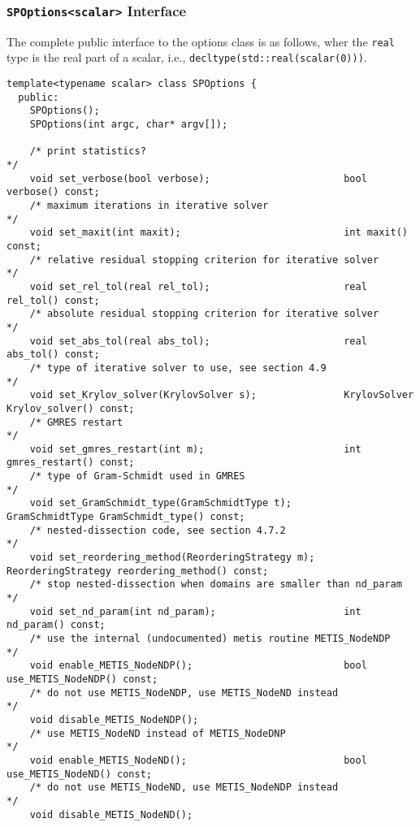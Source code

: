 \documentclass{article}
\begin{document}
\subsubsection{\lstinline[style=C]!SPOptions<scalar>! Interface}
\label{sec:SPOptions}
The complete public interface to the options class is as follows, wher
the \lstinline[style=C]!real! type is the real part of a scalar, i.e.,
\lstinline[style=C]!decltype(std::real(scalar(0)))!.
\begin{lstlisting}[style=C]
  template<typename scalar> class SPOptions {
  public:
    SPOptions();
    SPOptions(int argc, char* argv[]);

    /* print statistics?                                             */
    void set_verbose(bool verbose);                       bool verbose() const;
    /* maximum iterations in iterative solver                        */
    void set_maxit(int maxit);                            int maxit() const;
    /* relative residual stopping criterion for iterative solver     */
    void set_rel_tol(real rel_tol);                       real rel_tol() const;
    /* absolute residual stopping criterion for iterative solver     */
    void set_abs_tol(real abs_tol);                       real abs_tol() const;
    /* type of iterative solver to use, see section 4.9              */
    void set_Krylov_solver(KrylovSolver s);               KrylovSolver Krylov_solver() const;
    /* GMRES restart                                                 */
    void set_gmres_restart(int m);                        int gmres_restart() const;
    /* type of Gram-Schmidt used in GMRES                            */
    void set_GramSchmidt_type(GramSchmidtType t);         GramSchmidtType GramSchmidt_type() const;
    /* nested-dissection code, see section 4.7.2                     */
    void set_reordering_method(ReorderingStrategy m);     ReorderingStrategy reordering_method() const;
    /* stop nested-dissection when domains are smaller than nd_param */
    void set_nd_param(int nd_param);                      int nd_param() const;
    /* use the internal (undocumented) metis routine METIS_NodeNDP   */
    void enable_METIS_NodeNDP();                          bool use_METIS_NodeNDP() const;
    /* do not use METIS_NodeNDP, use METIS_NodeND instead            */
    void disable_METIS_NodeNDP();
    /* use METIS_NodeND instead of METIS_NodeDNP                     */
    void enable_METIS_NodeND();                           bool use_METIS_NodeND() const;
    /* do not use METIS_NodeND, use METIS_NodeNDP instead            */
    void disable_METIS_NodeND();

\end{lstlisting}
\end{document}
